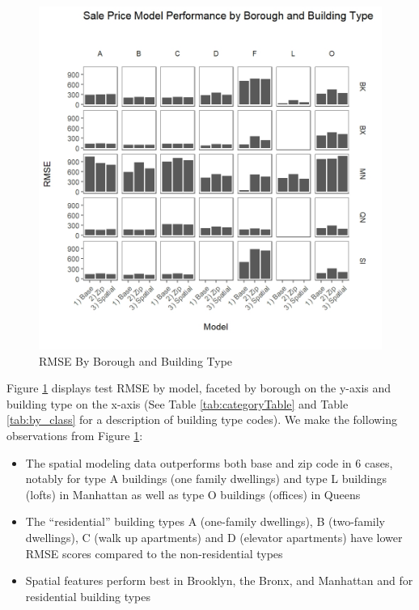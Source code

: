 \documentclass[conference,final,]{IEEEtran}
\makeatletter
\def\maxwidth{\ifdim\Gin@nat@width>\linewidth\linewidth
\else\Gin@nat@width\fi}
\let\Oldincludegraphics\includegraphics
\renewcommand{\includegraphics}[1]{\Oldincludegraphics[width=\maxwidth]{#1}}
\providecommand{\tightlist}{%
  \setlength{\itemsep}{0pt}\setlength{\parskip}{0pt}}
\makeatother
\begin{document}
\begin{figure}
\centering
\includegraphics{Sections/tables_and_figures/RMSE_by_boro_and_build_type.jpeg}
\caption{\label{fig:RMSE by boro and build type}RMSE By Borough and
Building Type}
\end{figure}

Figure \ref{fig:RMSE by boro and build type} displays test RMSE by
model, faceted by borough on the y-axis and building type on the x-axis
(See Table \ref{tab:categoryTable} and Table \ref{tab:by_class} for a
description of building type codes). We make the following observations
from Figure \ref{fig:RMSE by boro and build type}:

\begin{itemize}
\tightlist
\item
  The spatial modeling data outperforms both base and zip code in 6
  cases, notably for type A buildings (one family dwellings) and type L
  buildings (lofts) in Manhattan as well as type O buildings (offices)
  in Queens
\item
  The ``residential'' building types A (one-family dwellings), B
  (two-family dwellings), C (walk up apartments) and D (elevator
  apartments) have lower RMSE scores compared to the non-residential
  types
\item
  Spatial features perform best in Brooklyn, the Bronx, and Manhattan
  and for residential building types
\end{itemize}
\end{document}
